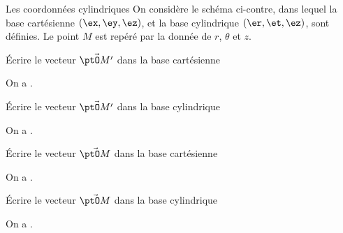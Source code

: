 \begin{exo}[PC][1][appli]{Les coordonnées cylindriques}
  \hauteurLargeurCadreReponse		{8mm}{4cm}
  \initialisationPartieGauche %
 On considère le schéma ci-contre, dans lequel
 la base cartésienne $(\ex,\ey,\ez)$,
 et la base cylindrique  $(\er,\et,\ez)$,
  sont définies.
  Le point $M$ est repéré par la donnée de $r$, $\theta$ et $z$.

  \begin{enonce}
  	Écrire le vecteur $\Vec{\ptO M'}$ dans la base cartésienne
  \end{enonce}


  \begin{corrige}
  	On a .
  \end{corrige}

  \begin{enonce}
  	Écrire le vecteur $\Vec{\ptO M'}$ dans la base cylindrique
  \end{enonce}


  \begin{corrige}
  	On a .
  \end{corrige}

  \begin{enonce}
  Écrire le vecteur $\Vec{\ptO M}$ dans la base cartésienne
  \end{enonce}


  \begin{corrige}
  	On a .
  \end{corrige}

  \begin{enonce}
  	Écrire le vecteur $\Vec{\ptO M}$ dans la base cylindrique
  \end{enonce}


  \begin{corrige}
  	On a .
  \end{corrige}

\initialisationPartieDroite
\begin{center}
\end{center}
\finalisationDuPartageDePage %
\end{exo}

